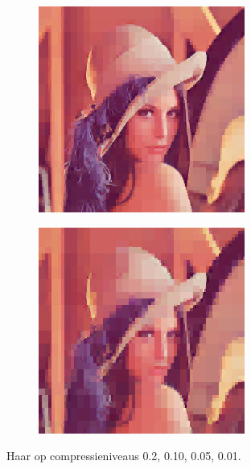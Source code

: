 \documentclass[11pt]{report}
\theoremstyle{plain}
\theoremstyle{remark}
\begin{document}
\begin{figure}
\begin{subfigure}[b]{0.24\textwidth}
	\end{subfigure}
	\begin{subfigure}[b]{0.24\textwidth}
		\centering
		\includegraphics[width=\textwidth]{plaatjes/Lenna_haar_0_03.png}
	\end{subfigure}
	\begin{subfigure}[b]{0.24\textwidth}
		\centering
		\includegraphics[width=\textwidth]{plaatjes/Lenna_haar_0_01.png}
	\end{subfigure}	
	\caption{Haar op compressieniveaus 0.2, 0.10, 0.05, 0.01.}
\end{figure}
\end{document}
